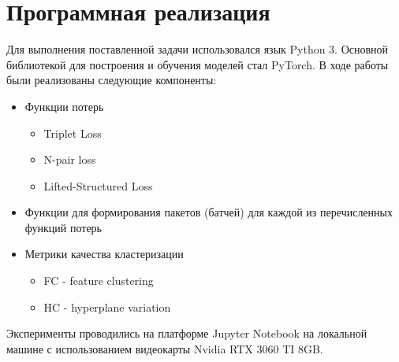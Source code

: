 \section{Программная реализация}
\label{sec:Chapter4} 

Для выполнения поставленной задачи использовался язык Python 3. Основной библиотекой для построения и обучения моделей стал PyTorch. В ходе работы были реализованы следующие компоненты:
\begin{itemize}
    \item Функции потерь
    \begin{itemize}
        \item Triplet Loss
        \item N-pair loss
        \item Lifted-Structured Loss
    \end{itemize}
    \item Функции для формирования пакетов (батчей) для каждой из перечисленных функций потерь
    \item Метрики качества кластеризации
    \begin{itemize}
        \item FC - feature clustering
        \item HC - hyperplane variation
    \end{itemize}
\end{itemize}

Эксперименты проводились на платформе Jupyter Notebook на локальной машине с использованием видеокарты Nvidia RTX 3060 TI 8GB.